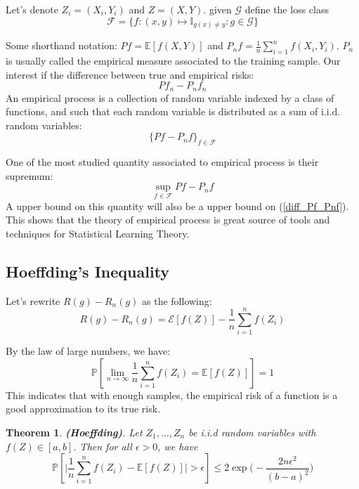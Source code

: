 \documentclass[12pt,reqno]{amsart}
\newtheorem{thm}{Theorem}[section]
\begin{document}
Let's denote $Z_i = (X_i,Y_i)$ and $Z = (X,Y)$. given $\mathcal{G}$ define the loss class
\begin{equation}
	\mathcal{F} = \{f: (x,y) \mapsto \mathbb{I}_{g(x)\neq y}: g\in \mathcal{G} \}
\end{equation}

Some shorthand notation: $Pf=\mathbb{E}[f(X,Y)]$ and $P_nf=\frac{1}{n}\sum_{i=1}^nf(X_i,Y_i)$. $P_n$ is usually called the empirical measure associated to the training sample. Our interest if the difference between true and empirical risks:
\begin{equation}
	\label{diff_Pf_Pnf}
	P f_n - P_n f_n
\end{equation}
An empirical process is a collection of random variable indexed by a class of functions, and such that each random variable is distributed as a sum of i.i.d. random variables:
\begin{equation}
	\{ P f - P_n f\}_{f\in\mathcal{F}} 
\end{equation}

One of the most studied quantity associated to empirical process is their supremum:
\begin{equation}
	\sup_{f\in\mathcal{F}}Pf-P_nf
\end{equation}
A upper bound on this quantity will also be a upper bound on (\ref{diff_Pf_Pnf}). This shows that the theory of empirical process is great source of tools and techniques for Statistical Learning Theory.

\subsection{Hoeffding's Inequality}
Let's rewrite $R(g) - R_n(g)$ as the following:
\begin{equation}
	R(g) - R_n(g) = \mathcal{E}[f(Z)] - \frac{1}{n}\sum_{i=1}^nf(Z_i)
\end{equation}

By the law of large numbers, we have:
\begin{equation}
	\mathbb{P}[\lim_{n\rightarrow \infty} \frac{1}{n}\sum_{i=1}^nf(Z_i) = \mathbb{E}[f(Z)]] = 1
\end{equation}
This indicates that with enough samples, the empirical risk of a function is a good approximation to its true risk.

\begin{thm} \textbf{(Hoeffding)}. 
Let $Z_1,\ldots, Z_n$ be i.i.d random variables with $f(Z)\in [a,b]$. Then for all $\epsilon > 0$, we have
\begin{equation}
	\mathbb{P}[\big |  \frac{1}{n}\sum_{i=1}^nf(Z_i) - \mathbb{E}[f(Z)]  \big | > \epsilon] \leq 2 \exp \bigg ( -\frac{2n\epsilon^2}{(b-a)^2} \bigg )
\end{equation}

\end{thm}
\end{document}
